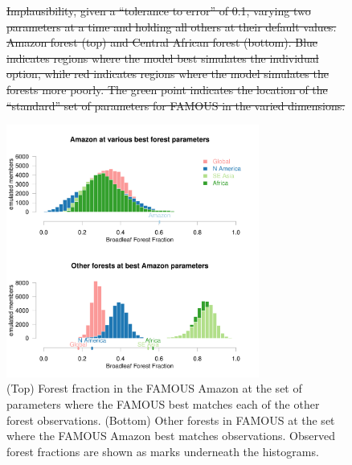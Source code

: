\documentclass[esd, article]{copernicus} %
\providecommand{\DIFdel}[1]{{\protect\color{red}\sout{#1}}}                      %
\providecommand{\DIFdelFL}[1]{\DIFdel{#1}} %
\providecommand{\DIFaddbeginFL}{} %
\providecommand{\DIFaddendFL}{} %
\providecommand{\DIFdelbeginFL}{} %
\providecommand{\DIFdelendFL}{} %
\begin{document}
\begin{figure}[t]
\DIFdelbeginFL %
{%
\DIFdelFL{Implausibility, given a ``tolerance to error'' of 0.1, varying two parameters at a time and holding all others at their default values. Amazon forest (top) and Central African forest (bottom). Blue indicates regions where the model best simulates the individual option, while red indicates regions where the model simulates the forests more poorly. The green point indicates the location of the ``standard'' set of parameters for FAMOUS in the varied dimensions.}}

\DIFdelendFL \DIFaddbeginFL \includegraphics[width=8.3cm]{graphics/best_inputs_swaps_hists_Paired.pdf}
\DIFaddendFL \caption{(Top) Forest fraction in the FAMOUS Amazon at the set of parameters where the FAMOUS best matches each of the other forest observations. (Bottom) Other forests in FAMOUS at the set where the FAMOUS Amazon best matches observations. Observed forest fractions are shown as marks underneath the histograms.}
\label{fig:best_inputs_swaps_hists_Paired}
\end{figure}
\end{document}

